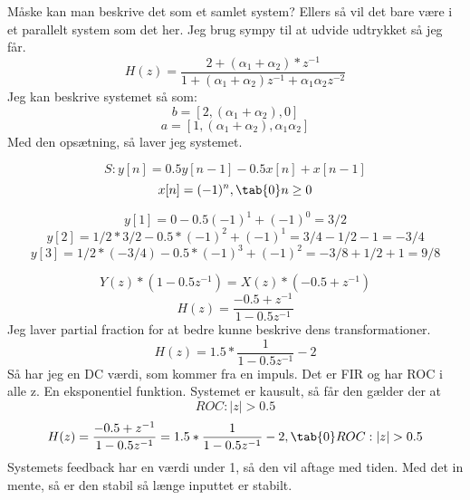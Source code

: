 \begin{rubrik}
\begin{eksamensOpgave}
\begin{UnderOpgave}
            
        \end{UnderOpgave}
        \begin{UnderOpgave}
            Måske kan man beskrive det som et samlet system? 
            Ellers så vil det bare være i et parallelt system som det her. 
            Jeg brug sympy til at udvide udtrykket så jeg får.
            \[H(z) = \frac{2 + (\alpha_1 + \alpha_2)* z^{-1}}{1 + (\alpha_1 + \alpha_2)z^{-1} + \alpha_1\alpha_2 z^{-2}}\]
            Jeg kan beskrive systemet så som: 
            \[b = [2, (\alpha_1 + \alpha_2), 0]\]
            \[a = [1, (\alpha_1 + \alpha_2), \alpha_1\alpha_2]\]
            Med den opsætning, så laver jeg systemet. 
            \vspace{100pt}       
        \end{UnderOpgave}
    \end{eksamensOpgave}
    \begin{eksamensOpgave}
        \[S: y[n] = 0.5y[n - 1] - 0.5x[n] + x[n - 1]\]
        \[x[n] = (-1)^n, \tab{0} n \geq 0\]
        \begin{UnderOpgave}[Beregn y1, y2 og y3]
            \[y[1] = 0 - 0.5(-1)^1 + (-1)^0 = 3/2\]
            \[y[2] = 1/2 * 3/2 - 0.5 * (-1)^2 + (-1)^1 = 3/4 - 1/2 - 1 = -3/4\]        
            \[y[3] = 1/2*(-3/4) - 0.5 * (-1)^3 + (-1)^2 = -3/8 + 1/2 + 1 = 9/8\]
        \end{UnderOpgave}
        \begin{UnderOpgave}
            \[Y(z)*(1 - 0.5z^{-1}) = X(z)*(-0.5 + z^{-1})\]
            \[H(z) = \frac{-0.5 + z^{-1}}{1 - 0.5z^{-1}}\]
            Jeg laver partial fraction for at bedre kunne beskrive dens transformationer.
            \[H(z) = 1.5 * \frac{1}{1 - 0.5z^{-1}} - 2\]
            Så har jeg en DC værdi, som kommer fra en impuls. Det er FIR og har ROC i alle z. 
            En eksponentiel funktion. Systemet er kausult, så får den gælder der at 
            \[ROC: |z| > 0.5\]
            \[H(z) = \frac{-0.5 + z^{-1}}{1 - 0.5z^{-1}} = 1.5 * \frac{1}{1 - 0.5z^{-1}} - 2, \tab{0} ROC: |z| > 0.5\]
            Systemets feedback har en værdi under 1, så den vil aftage med tiden. Med det in mente, så er den stabil så længe inputtet er stabilt. 


\end{UnderOpgave}
\end{eksamensOpgave}
\end{rubrik}
